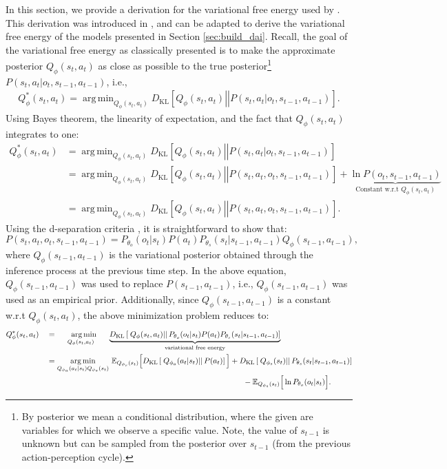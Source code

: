 \documentclass[twoside,11pt]{article}
\newcommand{\kl}[2]{D_{\mathrm{KL}} \left[ \left. \left. #1 \right|\right| #2 \right] }
\DeclareMathOperator*{\argmin}{arg\,min}
\begin{document}
In this section, we provide a derivation for the variational free energy used by \citet{DeepAIwithMCMC}. This derivation was introduced in \citep{DeepAI}, and can be adapted to derive the variational free energy of the models presented in Section \ref{sec:build_dai}. Recall, the goal of the variational free energy as classically presented is to make the approximate posterior $Q_\phi(s_t,a_t)$ as close as possible to the true posterior\footnote{By posterior we mean a conditional distribution, where the given are variables for which we observe a specific value. Note, the value of $s_{t-1}$ is unknown but can be sampled from the posterior over $s_{t-1}$ (from the previous action-perception cycle).} $P(s_t,a_t|o_t,s_{t-1},a_{t-1})$, i.e.,
\begin{align*}
Q^*_\phi(s_t,a_t) = \argmin_{Q_\phi(s_t,a_t)} \kl{Q_\phi(s_t,a_t)}{P(s_t,a_t|o_t,s_{t-1},a_{t-1})}.
\end{align*}
Using Bayes theorem, the linearity of expectation, and the fact that $Q_\phi(s_t,a_t)$ integrates to one:
\begin{align*}
Q_\phi^*(s_t,a_t) &= \argmin_{Q_\phi(s_t,a_t)} \kl{Q_\phi(s_t,a_t)}{P(s_t,a_t|o_t,s_{t-1},a_{t-1})}\\
&= \argmin_{Q_\phi(s_t,a_t)} \kl{Q_\phi(s_t,a_t)}{P(s_t,a_t,o_t,s_{t-1},a_{t-1})} + \underbrace{\ln P(o_t,s_{t-1},a_{t-1})}_{\text{Constant w.r.t }Q_\phi(s_t,a_t)}\\
&= \argmin_{Q_\phi(s_t,a_t)} \kl{Q_\phi(s_t,a_t)}{P(s_t,a_t,o_t,s_{t-1},a_{t-1})}.
\end{align*}
Using the d-separation criteria \citep{koller2009probabilistic}, it is straightforward to show that:
$$P(s_t,a_t,o_t,s_{t-1},a_{t-1}) = P_{\theta_o}(o_t|s_t)P(a_t)P_{\theta_s}(s_t|s_{t-1},a_{t-1})Q_{\phi}(s_{t-1}, a_{t-1}),$$
where $Q_\phi(s_{t-1}, a_{t-1})$ is the variational posterior obtained through the inference process at the previous time step. In the above equation, $Q_\phi(s_{t-1}, a_{t-1})$ was used to replace $P(s_{t-1}, a_{t-1})$, i.e., $Q_\phi(s_{t-1}, a_{t-1})$ was used as an empirical prior. Additionally, since $Q_\phi(s_{t-1}, a_{t-1})$ is a constant w.r.t $Q_\phi(s_t,a_t)$, the above minimization problem reduces to:
\begin{align}
Q^*_{\phi}(s_t,a_t)\quad &= \,\, \argmin_{\quad Q_{\phi}(s_t,a_t) \,\,\,\,\,\, \quad }\underbrace{\kl{Q_{\phi}(s_t,a_t)}{P_{\theta_o}(o_t|s_t)P(a_t)P_{\theta_s}(s_t|s_{t-1},a_{t-1})}}_{\text{variational free energy}}\label{eq:def_vfe_fountas}\\
&= \argmin_{Q_{\phi_a}(a_t|s_t)Q_{\phi_s}(s_t)}\, \mathbb{E}_{Q_{\phi_s}(s_t)}\Big[ \kl{Q_{\phi_a}(a_t|s_t)}{P(a_t)} \Big] + \kl{Q_{\phi_s}(s_t)}{P_{\theta_s}(s_t|s_{t-1},a_{t-1})}\nonumber\\
&\hspace{8.9cm}- \mathbb{E}_{Q_{\phi_s}(s_t)}\Big[\ln P_{\theta_o}(o_t|s_t)\Big].\nonumber
\end{align}
\end{document}
